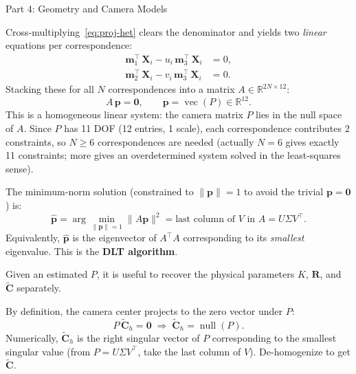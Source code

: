 \documentclass[letterpaper]{article}
\begin{document}
\begin{notes}{Part 4: Geometry and Camera Models}

Cross-multiplying~\eqref{eq:proj-het} clears the denominator and yields
two \emph{linear} equations per correspondence:
\begin{align}
  \mathbf{m}_1^\top\,\mathbf{X}_i - u_i\,\mathbf{m}_3^\top\,\mathbf{X}_i &= 0, \\
  \mathbf{m}_2^\top\,\mathbf{X}_i - v_i\,\mathbf{m}_3^\top\,\mathbf{X}_i &= 0.
\end{align}
Stacking these for all $N$ correspondences into a matrix $A \in \mathbb{R}^{2N\times 12}$:
\begin{equation}
  A\,\mathbf{p} = \mathbf{0}, \qquad \mathbf{p} = \operatorname{vec}(P) \in \mathbb{R}^{12}.
\end{equation}
This is a homogeneous linear system: the camera matrix $P$ lies in the
null space of $A$.  Since $P$ has 11 DOF (12 entries, 1 scale), each
correspondence contributes 2 constraints, so $N \geq 6$ correspondences
are needed (actually $N=6$ gives exactly 11 constraints; more gives an
overdetermined system solved in the least-squares sense).


The minimum-norm solution (constrained to $\|\mathbf{p}\|=1$ to avoid
the trivial $\mathbf{p}=\mathbf{0}$) is:
\begin{equation}
  \hat{\mathbf{p}} = \arg\min_{\|\mathbf{p}\|=1} \|A\mathbf{p}\|^2
  = \text{last column of } V \text{ in } A = U\Sigma V^\top.
\end{equation}
Equivalently, $\hat{\mathbf{p}}$ is the eigenvector of $A^\top A$
corresponding to its \emph{smallest} eigenvalue.  This is the
\textbf{DLT algorithm}.


Given an estimated $P$, it is useful to recover the physical parameters
$K$, $\mathbf{R}$, and $\widetilde{\mathbf{C}}$ separately.


By definition, the camera center projects to the zero vector under $P$:
\begin{equation}
  P\,\widetilde{\mathbf{C}}_h = \mathbf{0}
  \;\Longrightarrow\;
  \widetilde{\mathbf{C}}_h = \operatorname{null}(P).
\end{equation}
Numerically, $\widetilde{\mathbf{C}}_h$ is the right singular vector of
$P$ corresponding to the smallest singular value (from $P = U\Sigma V^\top$,
take the last column of $V$).  De-homogenize to get $\widetilde{\mathbf{C}}$.


\end{notes}
\end{document}
